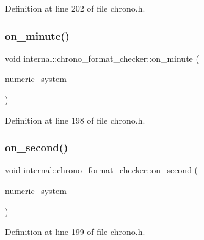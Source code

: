 Definition at line 202 of file chrono.\+h.

\mbox{\label{structinternal_1_1chrono__format__checker_a91dd8a338c3927a116ae3d1755465695}} 
\subsubsection{\texorpdfstring{on\+\_\+minute()}{on\_minute()}}
{\footnotesize\ttfamily void internal\+::chrono\+\_\+format\+\_\+checker\+::on\+\_\+minute (\begin{DoxyParamCaption}\item[{\hyperlink{namespaceinternal_a16e2a1195ca0f5beab658685f71df86b}{numeric\+\_\+system}}]{ }\end{DoxyParamCaption})\hspace{0.3cm}{\ttfamily [inline]}}



Definition at line 198 of file chrono.\+h.

\mbox{\label{structinternal_1_1chrono__format__checker_a53a692983a6d8bd693bda94dc9895a10}} 
\subsubsection{\texorpdfstring{on\+\_\+second()}{on\_second()}}
{\footnotesize\ttfamily void internal\+::chrono\+\_\+format\+\_\+checker\+::on\+\_\+second (\begin{DoxyParamCaption}\item[{\hyperlink{namespaceinternal_a16e2a1195ca0f5beab658685f71df86b}{numeric\+\_\+system}}]{ }\end{DoxyParamCaption})\hspace{0.3cm}{\ttfamily [inline]}}



Definition at line 199 of file chrono.\+h.

